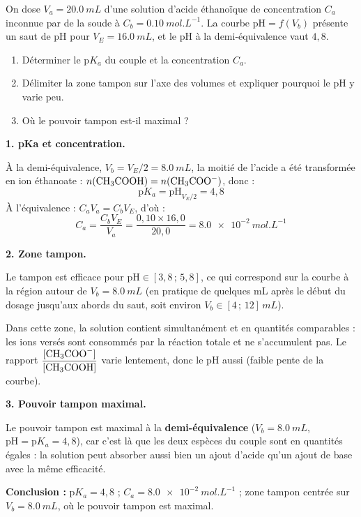 \documentclass[11pt]{article}
\begin{document}
\begin{exoresolu}
On dose $V_a = \SI{20,0}{mL}$ d'une solution d'acide éthanoïque de concentration $C_a$ inconnue par de la soude à $C_b = \SI{0,10}{mol.L^{-1}}$. La courbe $\text{pH} = f(V_b)$ présente un saut de pH pour $V_E = \SI{16,0}{mL}$, et le pH à la demi-équivalence vaut $4,8$.
\begin{enumerate}
\item Déterminer le $\text{p}K_a$ du couple et la concentration $C_a$.
\item Délimiter la zone tampon sur l'axe des volumes et expliquer pourquoi le pH y varie peu.
\item Où le pouvoir tampon est-il maximal ?
\end{enumerate}
\tcblower
\textbf{1. pKa et concentration.}

À la demi-équivalence, $V_b = V_E/2 = \SI{8,0}{mL}$, la moitié de l'acide a été transformée en ion éthanoate : $n(\ce{CH3COOH}) = n(\ce{CH3COO-})$, donc :
\[ \boxed{\text{p}K_a = \text{pH}_{V_E/2} = 4,8} \]
À l'équivalence : $C_a V_a = C_b V_E$, d'où :
\[ C_a = \frac{C_b V_E}{V_a} = \frac{0,10 \times 16,0}{20,0} = \SI{8,0e-2}{mol.L^{-1}} \]

\textbf{2. Zone tampon.}

Le tampon est efficace pour $\text{pH} \in [3,8\,;\,5,8]$, ce qui correspond sur la courbe à la région autour de $V_b = \SI{8,0}{mL}$ (en pratique de quelques mL après le début du dosage jusqu'aux abords du saut, soit environ $V_b \in [4\,;\,12]\,\si{mL}$).

Dans cette zone, la solution contient simultanément  et  en quantités comparables : les ions  versés sont consommés par la réaction totale  et ne s'accumulent pas. Le rapport $\dfrac{[\ce{CH3COO-}]}{[\ce{CH3COOH}]}$ varie lentement, donc le pH aussi (faible pente de la courbe).

\textbf{3. Pouvoir tampon maximal.}

Le pouvoir tampon est maximal à la \textbf{demi-équivalence} ($V_b = \SI{8,0}{mL}$, $\text{pH} = \text{p}K_a = 4,8$), car c'est là que les deux espèces du couple sont en quantités égales : la solution peut absorber aussi bien un ajout d'acide qu'un ajout de base avec la même efficacité.

\textbf{Conclusion :} $\text{p}K_a = 4,8$ ; $C_a = \SI{8,0e-2}{mol.L^{-1}}$ ; zone tampon centrée sur $V_b = \SI{8,0}{mL}$, où le pouvoir tampon est maximal.
\end{exoresolu}
\end{document}
